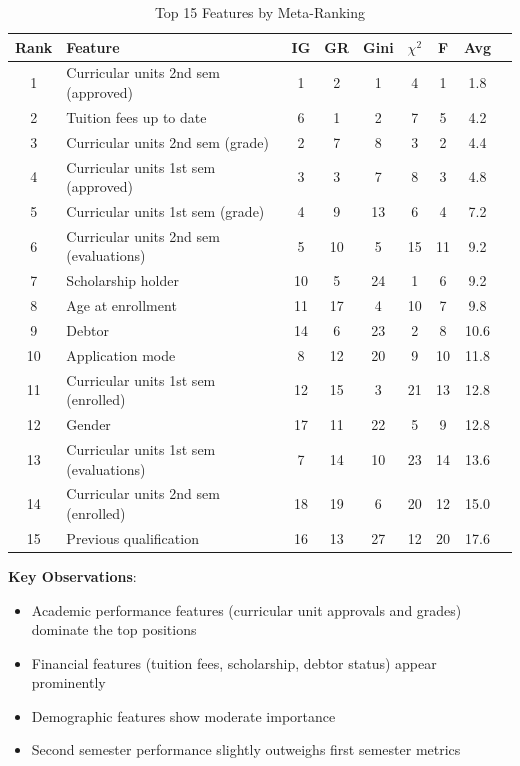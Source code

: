 \documentclass[journal]{IEEEtran}
\begin{document}
\begin{table}[t]
\centering
\caption{Top 15 Features by Meta-Ranking}
\label{tab:feature_ranking}
\begin{tabular}{clccccccc}
\toprule
\textbf{Rank} & \textbf{Feature} & \textbf{IG} & \textbf{GR} & \textbf{Gini} & \textbf{$\chi^2$} & \textbf{F} & \textbf{Avg} \\
\midrule
1 & Curricular units 2nd sem (approved) & 1 & 2 & 1 & 4 & 1 & 1.8 \\
2 & Tuition fees up to date & 6 & 1 & 2 & 7 & 5 & 4.2 \\
3 & Curricular units 2nd sem (grade) & 2 & 7 & 8 & 3 & 2 & 4.4 \\
4 & Curricular units 1st sem (approved) & 3 & 3 & 7 & 8 & 3 & 4.8 \\
5 & Curricular units 1st sem (grade) & 4 & 9 & 13 & 6 & 4 & 7.2 \\
6 & Curricular units 2nd sem (evaluations) & 5 & 10 & 5 & 15 & 11 & 9.2 \\
7 & Scholarship holder & 10 & 5 & 24 & 1 & 6 & 9.2 \\
8 & Age at enrollment & 11 & 17 & 4 & 10 & 7 & 9.8 \\
9 & Debtor & 14 & 6 & 23 & 2 & 8 & 10.6 \\
10 & Application mode & 8 & 12 & 20 & 9 & 10 & 11.8 \\
11 & Curricular units 1st sem (enrolled) & 12 & 15 & 3 & 21 & 13 & 12.8 \\
12 & Gender & 17 & 11 & 22 & 5 & 9 & 12.8 \\
13 & Curricular units 1st sem (evaluations) & 7 & 14 & 10 & 23 & 14 & 13.6 \\
14 & Curricular units 2nd sem (enrolled) & 18 & 19 & 6 & 20 & 12 & 15.0 \\
15 & Previous qualification & 16 & 13 & 27 & 12 & 20 & 17.6 \\
\bottomrule
\end{tabular}
\end{table}

\textbf{Key Observations}:
\begin{itemize}
\item Academic performance features (curricular unit approvals and grades) dominate the top positions
\item Financial features (tuition fees, scholarship, debtor status) appear prominently
\item Demographic features show moderate importance
\item Second semester performance slightly outweighs first semester metrics
\end{itemize}
\end{document}
